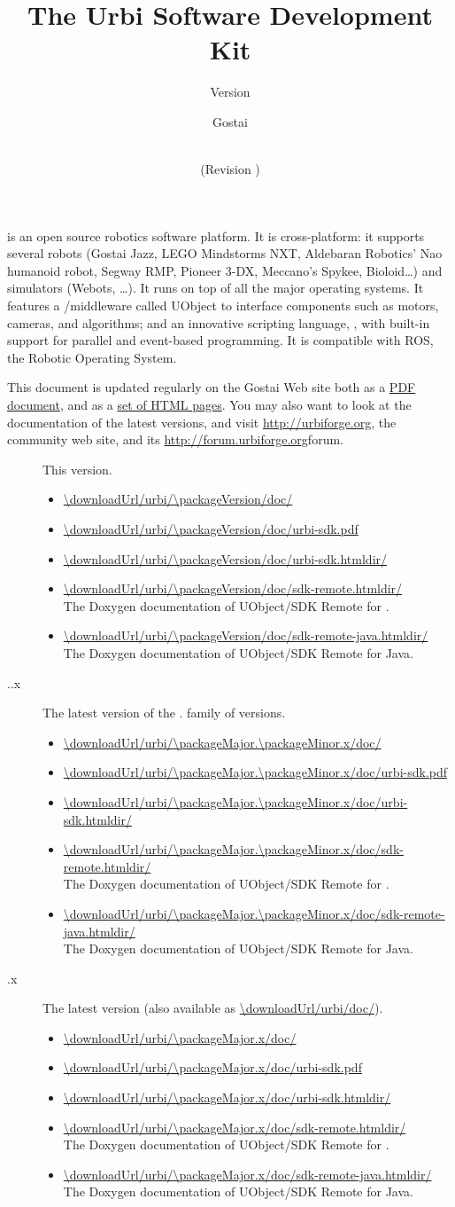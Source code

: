 \documentclass[openright,twoside,11pt,final]{book}
\title{The Urbi Software Development Kit}
\subtitle{Version \packageVersion}
\date{\VcsDay\\(Revision \VcsDescription)}
\author{Gostai}
\begin{document}
\maketitle

\urbi is an open source robotics software platform.  It is cross-platform:
it supports several robots (Gostai Jazz, LEGO Mindstorms NXT, Aldebaran
Robotics' Nao humanoid robot, Segway RMP, Pioneer 3-DX, Meccano's Spykee,
Bioloid\ldots) and simulators (Webots, \ldots).  It runs on top of all the
major operating systems.  It features a \Cxx/\Java middleware called UObject
to interface components such as motors, cameras, and algorithms; and an
innovative scripting language, \us, with built-in support for parallel and
event-based programming.  It is compatible with ROS, the Robotic Operating
System.

\bigskip

This document is updated regularly on the Gostai Web site both as a
\href{\docurl/urbi-sdk.pdf}{PDF document}, and as a
\href{\docurl/urbi-sdk.htmldir/}{set of HTML pages}.  You may also want to
look at the documentation of the latest versions, and visit
\url{http://urbiforge.org}, the \urbi community web site, and its
\url{http://forum.urbiforge.org}{forum}.

\newcommand{\versionItem}[2]
{
\item[\packageName{} #1] #2.

  \begin{itemize}
  \item \url{\downloadUrl/urbi/#1/doc/}
  \item \url{\downloadUrl/urbi/#1/doc/urbi-sdk.pdf}
  \item \url{\downloadUrl/urbi/#1/doc/urbi-sdk.htmldir/}
  \item \url{\downloadUrl/urbi/#1/doc/sdk-remote.htmldir/} \\
    The Doxygen documentation of UObject/SDK Remote for \Cxx.
  \item \url{\downloadUrl/urbi/#1/doc/sdk-remote-java.htmldir/} \\
    The Doxygen documentation of UObject/SDK Remote for Java.
  \end{itemize}
}
\begin{description}
\versionItem{\packageVersion}{This version}
\versionItem{\packageMajor.\packageMinor.x}{The latest version of the
  \packageMajor.\packageMinor{} family of versions}
\versionItem{\packageMajor.x}{The latest version (also available as
  \url{\downloadUrl/urbi/doc/})}
\end{description}



\tableofcontents







{
  
}

\end{document}
